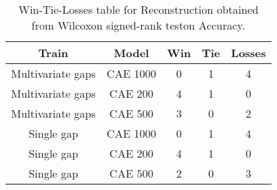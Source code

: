 \begin{table}[H]
\centering
\begin{tabular}{|c|c|c|c|c|}

    \textbf{Train} & \textbf{Model} &  \textbf{Win} &  \textbf{Tie} &  \textbf{Losses} \\
\hline

 Multivariate gaps &       CAE 1000 &             0 &             1 &                4 \\
\hline
 Multivariate gaps &        CAE 200 &             4 &             1 &                0 \\
\hline
 Multivariate gaps &        CAE 500 &             3 &             0 &                2 \\
\hline
        Single gap &       CAE 1000 &             0 &             1 &                4 \\
\hline
        Single gap &        CAE 200 &             4 &             1 &                0 \\
\hline
        Single gap &        CAE 500 &             2 &             0 &                3 \\
\hline

\end{tabular}
\caption{Win-Tie-Losses table for Reconstruction obtained from Wilcoxon signed-rank teston Accuracy.}
\label{tab:reconstruction_model_training_data_comparison}
\end{table}